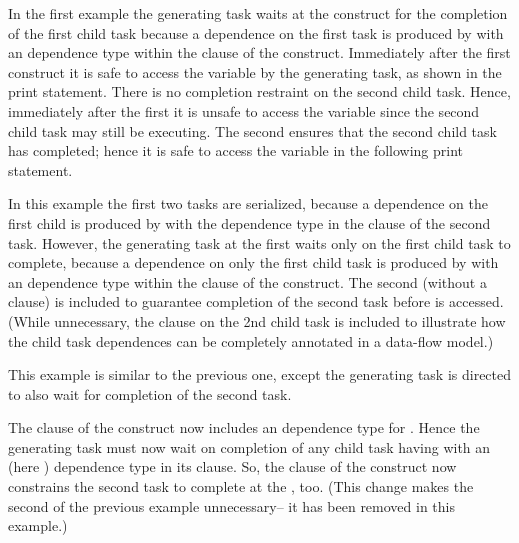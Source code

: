 In the first example the generating task waits at the  construct
for the completion of the first child task because a dependence on the first task
is produced by  with an  dependence type within the 
clause of the  construct.
Immediately after the first  construct it is safe to access the
 variable by the generating task, as shown in the print statement.
There is no completion restraint on the second child task.
Hence, immediately after the first  it is unsafe to access the
 variable since the second child task may still be executing.
The second  ensures that the second child task has completed; hence
it is safe to access the  variable in the following print statement.



In this example the first two tasks are serialized, because a dependence on
the first child is produced by  with the  dependence type
in the  clause of the second task.
However, the generating task at the first  waits only on the
first child task to complete, because a dependence on only the first child task
is produced by  with an  dependence type within the
 clause of the  construct.
The second  (without a  clause) is included
to guarantee completion of the second task before  is accessed.
(While unnecessary, the   clause on the  2nd child task is
included to illustrate how the child task dependences can be completely annotated
in a data-flow model.)





This example is similar to the previous one, except the generating task is
directed to also wait for completion of the second task.

The  clause of the  construct now includes an
 dependence type for .  Hence the generating task must now
wait on completion of any child task having  with an 
(here ) dependence type in its  clause.
So, the  clause of the  construct now constrains
the second task to complete at the , too.
(This change makes the second  of the previous example unnecessary--
it has been removed in this example.)

